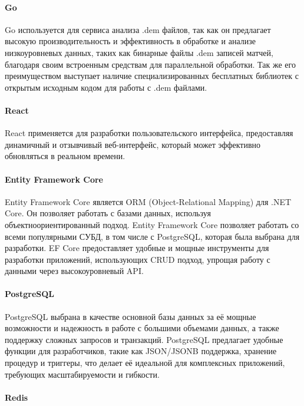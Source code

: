\paragraph{Go}

Go используется для сервиса анализа .dem файлов, так как он предлагает высокую производительность и эффективность в обработке и анализе низкоуровневых данных, таких как  бинарные файлы .dem записей матчей, благодаря своим встроенным средствам для параллельной обработки. Так же его преимуществом выступает наличие специализированных бесплатных библиотек с открытым исходным кодом для работы с .dem файлами.

\paragraph{React}

React применяется для разработки пользовательского интерфейса, предоставляя динамичный и отзывчивый веб-интерфейс, который может эффективно обновляться в реальном времени.

\paragraph{Entity Framework Core}

Entity Framework Core является ORM (Object-Relational Mapping) для
.NET Core. Он позволяет работать с базами данных, используя объектноориентированный подход. Entity Framework Core позволяет работать со всеми популярными СУБД, в том числе с PostgreSQL, которая была выбрана для разработки. EF Core предоставляет удобные и мощные инструменты для разработки приложений, использующих CRUD подход, упрощая работу с данными через высокоуровневый API.

\paragraph{PostgreSQL}

PostgreSQL выбрана в качестве основной базы данных за её мощные возможности и надежность в работе с большими объемами данных, а также поддержку сложных запросов и транзакций. PostgreSQL предлагает удобные функции для разработчиков, такие как JSON/JSONB поддержка, хранение процедур и триггеры, что делает её идеальной для комплексных приложений,
требующих масштабируемости и гибкости.

\paragraph{Redis}

